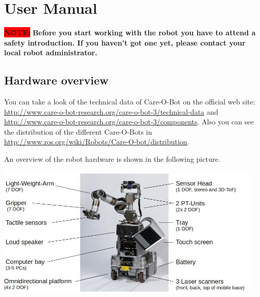 \chapter{User Manual}
\label{chap:user}    

{\colorbox{red}{\textbf{NOTE:}}}\textbf{ Before you start working with the robot you have to attend a safety introduction. If you haven't got one yet, please contact your local robot administrator.}

\section{Hardware overview}
You can take a look of the technical data of Care-O-Bot on the official web site: \url{http://www.care-o-bot-research.org/care-o-bot-3/technical-data} and \url{http://www.care-o-bot-research.org/care-o-bot-3/components}. Also you can see the distribution of the different Care-O-Bots in \url{http://www.ros.org/wiki/Robots/Care-O-bot/distribution}.

An overview of the robot hardware is shown in the following picture.
\begin{center}
 \includegraphics[width=0.95\textwidth]{images/hardware_overview.jpg}
\end{center}

